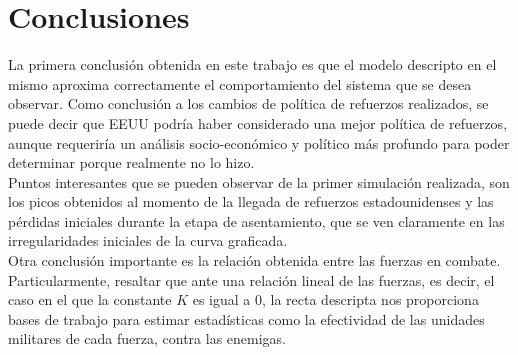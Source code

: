 \documentclass[a4paper,10pt]{article}
\begin{document}
\section{Conclusiones}

La primera conclusión obtenida en este trabajo es que el modelo descripto en el mismo aproxima correctamente el comportamiento del sistema 
que se desea observar. Como conclusión a los cambios de política de refuerzos realizados, se puede decir que EEUU podría haber considerado una
mejor política de refuerzos, aunque requeriría un análisis socio-económico y político más profundo para poder determinar porque realmente no
lo hizo.\\
Puntos interesantes que se pueden observar de la primer simulación realizada, son los picos obtenidos al momento de la llegada de refuerzos
estadounidenses y las pérdidas iniciales durante la etapa de asentamiento, que se ven claramente en las irregularidades iniciales de la curva 
graficada.\\
Otra conclusión importante es la relación obtenida entre las fuerzas en combate. Particularmente, resaltar que ante una relación lineal de las
fuerzas, es decir, el caso en el que la constante $K$ es igual a $0$, la recta descripta nos proporciona bases de trabajo para estimar estadísticas
como la efectividad de las unidades militares de cada fuerza, contra las enemigas.
\end{document}
